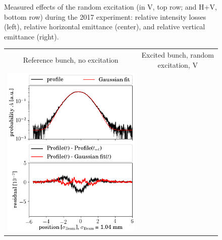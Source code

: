 \documentclass[
prstab
,reprint
,linenumbers
,longbibliography
,preprintnumbers
,showkeys
,amsfonts,amssymb,amsmath
,floatfix
]{revtex4-1}
\newlength{\bsrtwidth}
\begin{document}
\begin{figure}
\begin{tabular}{ccc}
  \end{tabular}
  \caption{Measured effects of the random excitation (in V, top row;
    and H+V, bottom row) during the 2017 experiment: relative
    intensity losses (left), relative horizontal emittance (center),
    and relative vertical emittance (right).}
  \label{fig:ranexp}
\end{figure}


\begin{figure}
  \begin{tabular}{cc}
    Reference bunch, no excitation & Excited bunch, random excitation, V \\
    \includegraphics[width=\bsrtwidth]{profile_v_ranv_slot_1698.png} &

\end{tabular}
\end{figure}
\end{document}
